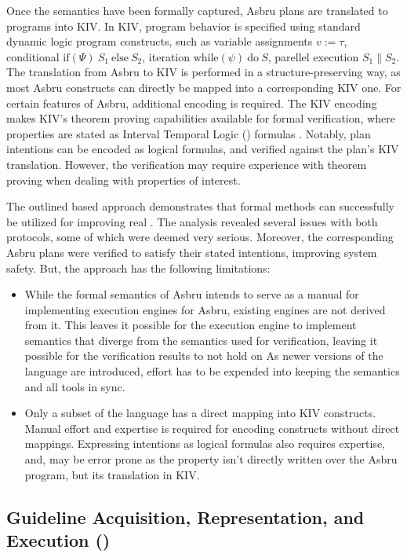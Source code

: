 Once the semantics have been formally captured, Asbru plans are
translated to programs into KIV. In KIV, program behavior is
specified using standard dynamic logic program constructs,
such as variable assignments $v := \tau$, conditional $\text{if}(\Psi)\ S_1
\ \text{else}\ S_2 $, iteration $\text{while}(\psi)\ \text{do}\ S$,
parellel execution $S_1 \parallel S_2$. The translation from Asbru
to KIV is performed in a structure-preserving way, as most
Asbru constructs can directly be mapped into a corresponding KIV one.
For certain features of Asbru, additional encoding is required.
The KIV encoding makes KIV's theorem proving capabilities available
for formal verification, where properties are stated as
Interval Temporal Logic (\ITL{}) formulas \cite{AllenJLC94}.
Notably, plan intentions can be encoded as logical formulas,
and verified against the plan's KIV translation. However,
the verification may require experience with theorem proving
when dealing with properties of interest.

The outlined based approach demonstrates
that formal methods can successfully be utilized
for improving real \BPGs{}. The analysis revealed
several issues with both protocols, some of which were
deemed very serious. Moreover, the corresponding Asbru plans
were verified to satisfy their stated intentions, improving
system safety.
But, the approach has the following limitations:
\begin{itemize}
  \item While the formal semantics of Asbru intends to serve
    as a manual for implementing execution engines for Asbru,
    existing engines are not derived from it. This leaves it possible
    for the execution engine to implement semantics that diverge
    from the \SOS{} semantics used for verification, leaving
    it possible for the verification results to not hold on
    As newer versions of the language are introduced, effort has
    to be expended into keeping the semantics and all tools in sync.
  \item Only a subset of the language has a direct mapping into
    KIV constructs. Manual effort and expertise is required
    for encoding constructs without direct mappings.
    Expressing intentions as logical formulas also requires
    expertise, and, may be error prone as the property isn't
    directly written over the Asbru program, but its translation in KIV.
\end{itemize}

\subsection{Guideline Acquisition, Representation, and Execution (\GLARE{})}\label{sec:glare}

